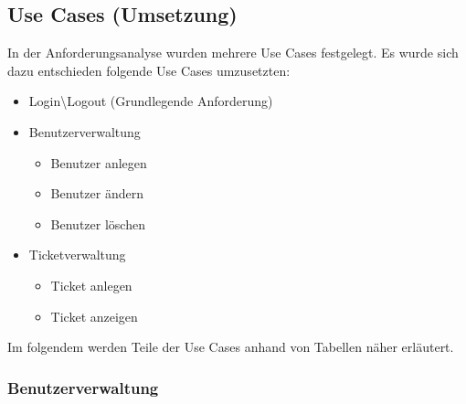 \documentclass[12pt, a4paper]{article}
\begin{document}
\newpage
\subsection{Use Cases (Umsetzung)}
In der Anforderungsanalyse wurden mehrere Use Cases festgelegt. Es wurde sich dazu entschieden folgende Use Cases umzusetzten:
\begin{itemize}
\item Login\textbackslash Logout (Grundlegende Anforderung)
\item Benutzerverwaltung
\begin{itemize}
\item Benutzer anlegen
\item Benutzer ändern
\item Benutzer löschen

\end{itemize}
\item Ticketverwaltung
\begin{itemize}
\item Ticket anlegen
\item Ticket anzeigen
\end{itemize}


\end{itemize}

Im folgendem werden Teile der Use Cases anhand von Tabellen näher erläutert.




\subsubsection{Benutzerverwaltung}
\end{document}
